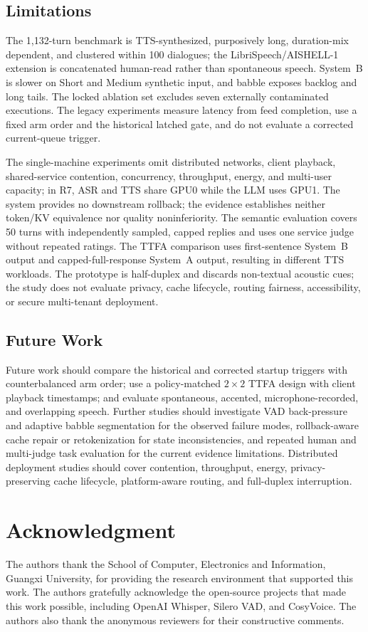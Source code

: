 \documentclass[conference]{IEEEtran}
\begin{document}
\subsection{Limitations}

The 1,132-turn benchmark is TTS-synthesized, purposively long, duration-mix dependent, and clustered within 100 dialogues; the LibriSpeech/AISHELL-1 extension is concatenated human-read rather than spontaneous speech. System~B is slower on Short and Medium synthetic input, and babble exposes backlog and long tails. The locked ablation set excludes seven externally contaminated executions. The legacy experiments measure latency from feed completion, use a fixed arm order and the historical latched gate, and do not evaluate a corrected current-queue trigger.

The single-machine experiments omit distributed networks, client playback, shared-service contention, concurrency, throughput, energy, and multi-user capacity; in R7, ASR and TTS share GPU0 while the LLM uses GPU1. The system provides no downstream rollback; the evidence establishes neither token/KV equivalence nor quality noninferiority. The semantic evaluation covers 50 turns with independently sampled, capped replies and uses one service judge without repeated ratings. The TTFA comparison uses first-sentence System~B output and capped-full-response System~A output, resulting in different TTS workloads. The prototype is half-duplex and discards non-textual acoustic cues; the study does not evaluate privacy, cache lifecycle, routing fairness, accessibility, or secure multi-tenant deployment.

\subsection{Future Work}

Future work should compare the historical and corrected startup triggers with counterbalanced arm order; use a policy-matched $2\times2$ TTFA design with client playback timestamps; and evaluate spontaneous, accented, microphone-recorded, and overlapping speech. Further studies should investigate VAD back-pressure and adaptive babble segmentation for the observed failure modes, rollback-aware cache repair or retokenization for state inconsistencies, and repeated human and multi-judge task evaluation for the current evidence limitations. Distributed deployment studies should cover contention, throughput, energy, privacy-preserving cache lifecycle, platform-aware routing, and full-duplex interruption.

\section*{Acknowledgment}

The authors thank the School of Computer, Electronics and Information, Guangxi University, for providing the research environment that supported this work. The authors gratefully acknowledge the open-source projects that made this work possible, including OpenAI Whisper, Silero VAD, and CosyVoice. The authors also thank the anonymous reviewers for their constructive comments.



\end{document}
